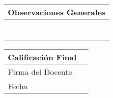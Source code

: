 \documentclass[12pt]{article}
\numberwithin{equation}{section}
\numberwithin{figure}{section}
\numberwithin{table}{section}
\begin{document}
\begin{titlepage}
\begin{center}
        \vfill

        \begin{tabular}{|p{}|}
            \hline \vfill
            Observaciones Generales
            \\[6pt] \hline
            \\[12pt] \hline
            \\[12pt] \hline
            \\[12pt] \hline
            \\[12pt] \hline
            \\[12pt] \hline
            \\[12pt] \hline
            \\[12pt] \hline
        \end{tabular}

        \vfill

        \begin{tabular}{|p{}|p{}|}
            \hline
            \vfill Calificación Final \vfill & \\[36pt]
            \hline
            \vfill Firma del Docente \vfill & \\[36pt]
            \hline
            \vfill Fecha \vfill & \\[6pt]
            \hline
        \end{tabular}

    \end{center}

\end{titlepage}

\setcounter{page}{1}

\ifx \indice \undefined
\else
    \tableofcontents
    \newpage
\fi




\newcommand{\figuregraph}[3]{
    \begin{figure}[H]
        \center
        \texttt{[image: \#2]}
        \caption{#3}\label{#2}
    \end{figure}
}
\end{document}
